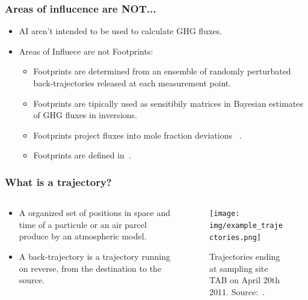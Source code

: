\documentclass[aspectratio=169]{beamer}
\begin{document}
\begin{frame}
    \frametitle{Areas of influcence are NOT...}
    \begin{itemize}
        \item AI aren't intended to be used to calculate GHG fluxes.
        \item Areas of Influece are not Footprints:
        \begin{itemize}
            \item Footprints are determined from an ensemble of randomly 
                perturbated back-trajectories released at each measurement 
                point.
            \item Footprints are tipically used as sensitibily matrices in 
                Bayesian estimates of GHG fluxes in inversions.
            \item Footprints project fluxes into mole fraction 
                deviations ~\cite{cassol2020}.
            \item Footprints are defined in~\cite{gerbig2003,hu2019}.
        \end{itemize}
    \end{itemize}
\end{frame}

\begin{frame}
    \frametitle{What is a trajectory?}
    \begin{columns}
        \begin{column}{0.5\textwidth}
            \begin{itemize}
                \item A organized set of positions in space and time of a 
                    particule or an air parcel produce by an atmospheric model.
                \item A back-trajectory is a trajectory running on reverse, 
                    from the destination to the source.
            \end{itemize}
        \end{column}
        \begin{column}{0.5\textwidth}
            \begin{figure}
                \centering
                \texttt{[image: img/example\_trajectories.png]}
                \caption{Trajectories ending at sampling site TAB on April 20th 
                2011. Source:~\cite{cassol2020}. }
            \end{figure}
        \end{column}
     \end{columns}
\end{frame}
\end{document}
